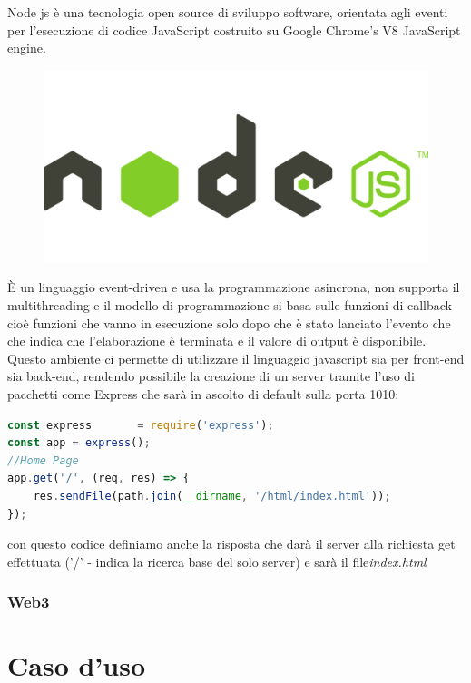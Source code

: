 \documentclass[12pt,titlepage]{report}
\begin{document}
Node js è una tecnologia open source di sviluppo software, orientata agli eventi per l'esecuzione di codice JavaScript costruito su Google Chrome’s V8 JavaScript engine.
\begin{figure}[h]
	\includegraphics[height=0.15\textheight]{node-js}
	\centering
\end{figure}
È un linguaggio event-driven e usa la programmazione asincrona, non supporta il multithreading e il modello di programmazione si basa sulle funzioni di callback cioè funzioni che vanno in esecuzione solo dopo che è stato lanciato l'evento che che indica che l'elaborazione è terminata e il valore di output è disponibile.
Questo ambiente ci permette di utilizzare il linguaggio javascript sia per front-end sia back-end, rendendo possibile la creazione di un server tramite l'uso di pacchetti come Express che sarà in ascolto di default sulla porta 1010:
\begin{lstlisting}[language=JavaScript]
const express 		= require('express');
const app = express();
//Home Page
app.get('/', (req, res) => {
  	res.sendFile(path.join(__dirname, '/html/index.html'));
});
\end{lstlisting}
con questo codice definiamo anche la risposta che darà il server alla richiesta get effettuata ('/' - indica la ricerca base del solo server) e sarà il file\textit{index.html}

\subsection{Web3}

\chapter{Caso d'uso}
\end{document}
